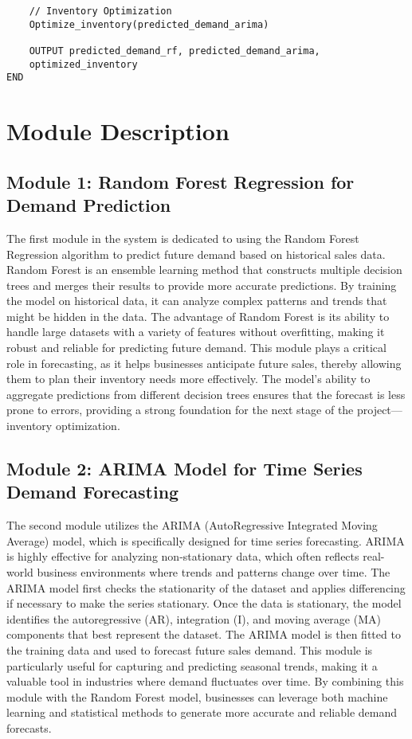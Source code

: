 \documentclass[10pt]{report}
\begin{document}
\begin{center}
\begin{verbatim}
    // Inventory Optimization
    Optimize_inventory(predicted_demand_arima)
    
    OUTPUT predicted_demand_rf, predicted_demand_arima, 
    optimized_inventory
END

\end{verbatim}


\section{Module Description}

\subsection{Module 1: Random Forest Regression for Demand Prediction}
The first module in the system is dedicated to using the Random Forest Regression algorithm to predict future demand based on historical sales data. Random Forest is an ensemble learning method that constructs multiple decision trees and merges their results to provide more accurate predictions. By training the model on historical data, it can analyze complex patterns and trends that might be hidden in the data. The advantage of Random Forest is its ability to handle large datasets with a variety of features without overfitting, making it robust and reliable for predicting future demand. This module plays a critical role in forecasting, as it helps businesses anticipate future sales, thereby allowing them to plan their inventory needs more effectively. The model’s ability to aggregate predictions from different decision trees ensures that the forecast is less prone to errors, providing a strong foundation for the next stage of the project—inventory optimization.

\subsection{Module 2: ARIMA Model for Time Series Demand Forecasting}
The second module utilizes the ARIMA (AutoRegressive Integrated Moving Average) model, which is specifically designed for time series forecasting. ARIMA is highly effective for analyzing non-stationary data, which often reflects real-world business environments where trends and patterns change over time. The ARIMA model first checks the stationarity of the dataset and applies differencing if necessary to make the series stationary. Once the data is stationary, the model identifies the autoregressive (AR), integration (I), and moving average (MA) components that best represent the dataset. The ARIMA model is then fitted to the training data and used to forecast future sales demand. This module is particularly useful for capturing and predicting seasonal trends, making it a valuable tool in industries where demand fluctuates over time. By combining this module with the Random Forest model, businesses can leverage both machine learning and statistical methods to generate more accurate and reliable demand forecasts.


\end{center}
\end{document}
